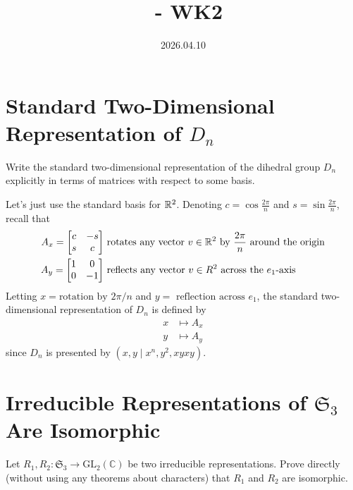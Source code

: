 \documentclass[12pt]{article}
\title{\course\ - WK2}
\author{\myname}
\date{2026.04.10}
\begin{document}
\maketitle
\thispagestyle{fancy}


\section{Standard Two-Dimensional Representation of $D_n$}

Write the standard two-dimensional representation of the dihedral group $D_n$
explicitly in terms of matrices with respect to some basis.

\noindent\dotfill

Let's just use the standard basis for $\mathbb{R}^2$. 
Denoting $c = \cos{\frac{2\pi}{n}}$ and $s = \sin{\frac{2\pi}{n}}$, recall that 
\begin{align*}
  A_x = \begin{bmatrix}c & -s \\ s & c\end{bmatrix} & \text{ rotates any vector } v \in \mathbb{R}^2 \text{ by } \frac{2\pi}{n} \text{ around the origin} \\ 
  A_y = \begin{bmatrix}1 & 0 \\ 0 & -1\end{bmatrix} & \text{ reflects any vector } v \in R^2 \text{ across the } e_1 \text{-axis}
\end{align*}
Letting $x = \text{rotation by } 2\pi / n$ and $y = \text{ reflection across } e_1$, the standard two-dimensional representation of $D_n$ is defined by 
\begin{align*}
  x & \mapsto A_x \\ 
  y & \mapsto A_y
\end{align*}
since $D_n$ is presented by $(x, y \mid x^n, y^2, xyxy)$. 


\section{Irreducible Representations of $\mathfrak{S}_3$ Are Isomorphic}
\newcommand{\grp}{\mathfrak{S}_3}

Let $R_1, R_2 \colon \mathfrak{S}_3 \to \mathrm{GL}_2(\mathbb{C})$ be two irreducible
representations.  Prove directly (without using any theorems about characters)
that $R_1$ and $R_2$ are isomorphic.
\end{document}

